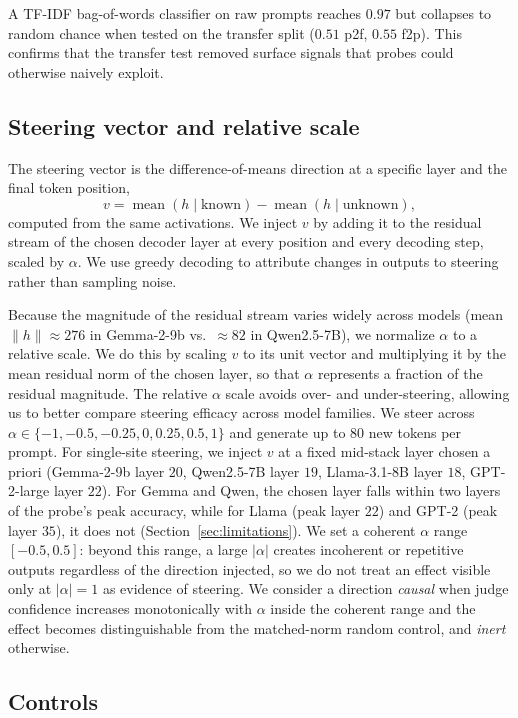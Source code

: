 \documentclass{article}
\begin{document}
A TF-IDF bag-of-words classifier on raw prompts reaches $0.97$ but collapses to random chance when tested on the transfer split ($0.51$ p2f, $0.55$ f2p). This confirms that the transfer test removed surface signals that probes could otherwise naively exploit.

\subsection{Steering vector and relative scale}

The steering vector is the difference-of-means direction at a specific layer and the final token position,
\[
    v = \operatorname{mean}(h \mid \text{known}) - \operatorname{mean}(h \mid \text{unknown}),
\]
computed from the same activations. We inject $v$ by adding it to the residual stream of the chosen decoder layer at every position and every decoding step, scaled by $\alpha$. We use greedy decoding to attribute changes in outputs to steering rather than sampling noise.

Because the magnitude of the residual stream varies widely across models (mean $\lVert h \rVert \approx 276$ in Gemma-2-9b vs.\ $\approx 82$ in Qwen2.5-7B), we normalize $\alpha$ to a relative scale. We do this by scaling $v$ to its unit vector and multiplying it by the mean residual norm of the chosen layer, so that $\alpha$ represents a fraction of the residual magnitude. The relative $\alpha$ scale avoids over- and under-steering, allowing us to better compare steering efficacy across model families. We steer across $\alpha \in \{-1, -0.5, -0.25, 0, 0.25, 0.5, 1\}$ and generate up to $80$ new tokens per prompt. For single-site steering, we inject $v$ at a fixed mid-stack layer chosen a priori (Gemma-2-9b layer $20$, Qwen2.5-7B layer $19$, Llama-3.1-8B layer $18$, GPT-2-large layer $22$). For Gemma and Qwen, the chosen layer falls within two layers of the probe's peak accuracy, while for Llama (peak layer $22$) and GPT-2 (peak layer $35$), it does not (Section~\ref{sec:limitations}). We set a coherent $\alpha$ range $[-0.5, 0.5]$: beyond this range, a large $|\alpha|$ creates incoherent or repetitive outputs regardless of the direction injected, so we do not treat an effect visible only at $|\alpha| = 1$ as evidence of steering. We consider a direction \emph{causal} when judge confidence increases monotonically with $\alpha$ inside the coherent range and the effect becomes distinguishable from the matched-norm random control, and \emph{inert} otherwise.

\subsection{Controls}
\end{document}
